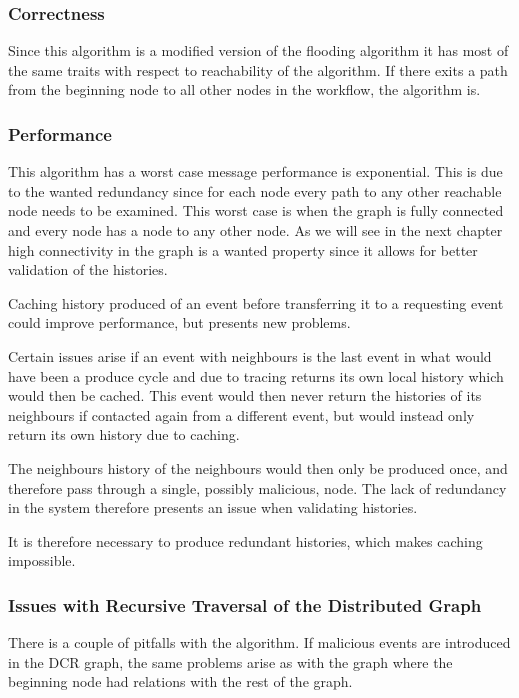 	\subsubsection{Correctness}
	Since this algorithm is a modified version of the flooding algorithm it has most of the same traits with respect to reachability of the algorithm. If there exits a path from the beginning node to all other nodes in the workflow, the algorithm is. 
	
	\subsubsection{Performance}
	This algorithm has a worst case message performance is exponential. This is due to the wanted redundancy since for each node every path to any other reachable node needs to be examined. This worst case is when the graph is fully connected and every node has a node to any other node. As we will see in the next chapter high connectivity in the graph is a wanted property since it allows for better validation of the histories.
	
	\newpar Caching history produced of an event before transferring it to a requesting event could improve performance, but presents new problems. 
	
	Certain issues arise if an event with neighbours is the last event in what would have been a produce cycle and due to tracing returns its own local history which would then be cached. This event would then never return the histories of its neighbours if contacted again from a different event, but would instead only return its own history due to caching. 
	
	The neighbours history of the neighbours would then only be produced once, and therefore pass through a single, possibly malicious, node. The lack of redundancy in the system therefore presents an issue when validating histories.
	
	It is therefore necessary to produce redundant histories, which makes caching impossible.
	
	\subsubsection{Issues with Recursive Traversal of the Distributed Graph}
	
	There is a couple of pitfalls with the algorithm. If malicious events are introduced in the DCR graph, the same problems arise as with the graph where the beginning node had relations with the rest of the graph. 
	
